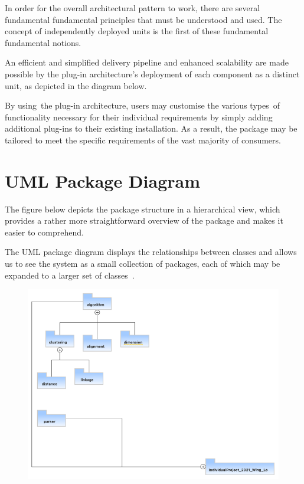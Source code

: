 \documentclass[]{final_report}
\begin{document}
In order for the overall architectural pattern to work, there are several fundamental fundamental principles that must be understood and used. The concept of independently deployed units is the first of these fundamental fundamental notions.

An efficient and simplified delivery pipeline and enhanced scalability are made possible by the plug-in architecture's deployment of each component as a distinct unit, as depicted in the diagram below.

By using the plug-in architecture, users may customise the various types of functionality necessary for their individual requirements by simply adding additional plug-ins to their existing installation. As a result, the package may be tailored to meet the specific requirements of the vast majority of consumers.

\section{UML Package Diagram}
The figure below depicts the package structure in a hierarchical view, which provides a rather more straightforward overview of the package and makes it easier to comprehend.

The UML package diagram displays the relationships between classes and allows us to see the system as a small collection of packages, each of which may be expanded to a larger set of classes~\cite{pfleeger2006software}.

\begin{figure}[H]
    \centering
    \includegraphics[width=1\textwidth]{packages.umlcd.png}
    \label{fig:package}
\end{figure}
\end{document}
